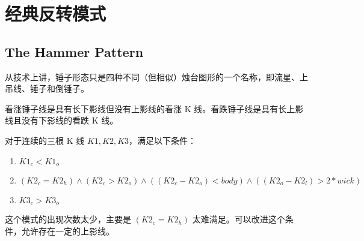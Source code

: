 \chapter{经典反转模式}
\section{The Hammer Pattern}
从技术上讲，锤子形态只是四种不同（但相似）烛台图形的一个名称，即流星、上吊线、锤子和倒锤子。

看涨锤子线是具有长下影线但没有上影线的看涨 K 线。看跌锤子线是具有长上影线且没有下影线的看跌 K 线。

对于连续的三根 K 线 $K1, K2, K3$，满足以下条件：
\begin{enumerate}
    \item $K1_c < K1_o$
    \item $(K2_c=K2_h) \land (K2_c > K2_o) \land ((K2_c-K2_o)<body) \land ((K2_o-K2_l)>2*wick)$
    \item $K3_c>K3_o$
\end{enumerate}
\begin{tcolorbox}[title=警告！,colframe=red!80!black]
    这个模式的出现次数太少，主要是 $(K2_c=K2_h)$ 太难满足。可以改进这个条件，允许存在一定的上影线。
\end{tcolorbox}